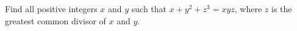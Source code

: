 Find all positive integers $x$ and $y$ such that $x + y^2 + z^3 = xyz$, where $z$ is the greatest common divisor of $x$ and $y$.
